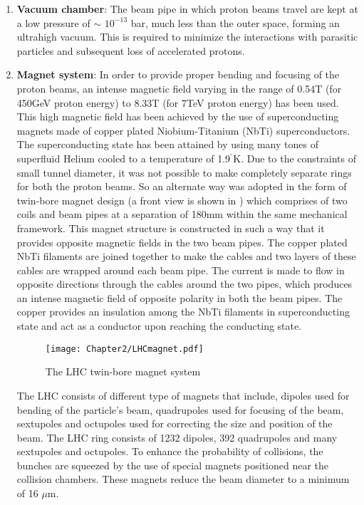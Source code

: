 \begin{enumerate}[leftmargin=*]
\item {\bf{Vacuum chamber}}: The beam pipe in which proton beams travel are kept at a low pressure of $\sim$ $10^{-13}$ bar, much less
  than the outer space, forming an ultrahigh vacuum. This is required to minimize the interactions with parasitic particles and subsequent loss of
  accelerated protons. 
\item {\bf{Magnet system}}: In order to provide proper bending and focusing of the proton beams, an intense magnetic field varying in the range of 0.54\unit{T}
  (for 450\unit{GeV} proton energy) to 8.33\unit{T} (for 7\unit{TeV} proton energy) has been used. This high magnetic field has been achieved by the use of superconducting
  magnets made of copper plated Niobium-Titanium (NbTi) superconductors. The superconducting state has been attained by using many tones of superfluid Helium
  cooled to a temperature of 1.9$^{^{\circ}}$\unit{K}. Due to the constraints of small tunnel diameter, it was not possible to make completely
  separate rings for both the proton beams. So an alternate way was adopted in the form of twin-bore magnet design (a front view is shown in \fig{\ref{fig:LHCmagent}})
  which comprises of two coils and beam pipes
  at a separation of 180\unit{mm} within the same mechanical framework. This magnet structure is constructed in such a way that it provides
  opposite magnetic fields in the two beam pipes. The copper plated NbTi filaments are joined together to make the cables and two layers of these cables
  are wrapped around each beam pipe. The current is made to flow in opposite directions through the cables around the two pipes, which produces an intense magnetic field
  of opposite polarity in both the beam pipes. The copper provides an insulation among the NbTi filaments in superconducting state and act as a
  conductor upon reaching the conducting state.
  \begin{figure}[h]
  \begin{center}
  \texttt{[image: Chapter2/LHCmagnet.pdf]}
  \caption{The LHC twin-bore magnet system}
  \label{fig:LHCmagent}
  \end{center}
  \end{figure}

  The LHC consists of different type of magnets that include, dipoles used for bending of the particle's beam,
  quadrupoles used for focusing of the beam, sextupoles and octupoles used for
  correcting the size and position of the beam. The LHC ring consists of 1232 dipoles, 392 quadrupoles and many sextupoles and octupoles.
  To enhance the probability of collisions, the bunches are squeezed by the use of special magnets positioned
  near the collision chambers. These magnets reduce the beam diameter to a minimum of 16 $\mu$m.

\end{enumerate}

